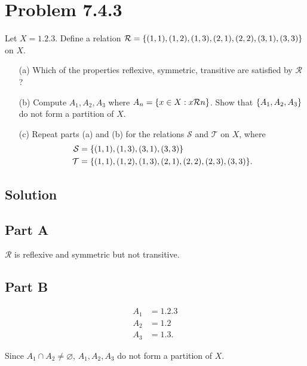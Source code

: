 \documentclass[12pt]{extarticle}
\begin{document}
\section*{Problem 7.4.3}
Let $X = \qty{1,2,3}$. Define a relation $\mathcal{R} = \qty{(1,1),(1,2),(1,3),(2,1),(2,2),(3,1),(3,3)}$ on $X$.

\begin{enumerate}
	\item[(a)] Which of the properties reflexive, symmetric, transitive are satisfied by $\mathcal{R}$?
	\item[(b)] Compute $A_1, A_2, A_3$ where $A_n = \qty{x \in X : x \mathcal{R} n}$. Show that $\qty{A_1, A_2, A_3}$ do not form a partition of $X$.
	\item[(c)] Repeat parts (a) and (b) for the relations $\mathcal{S}$ and $\mathcal{T}$ on $X$, where
		\begin{align*}
			\mathcal{S} &= \qty{(1, 1), (1, 3), (3, 1), (3, 3)} \\
			\mathcal{T} &= \qty{(1,1),(1,2),(1,3),(2,1),(2,2),(2,3),(3,3)}
		.\end{align*}
\end{enumerate}

\subsection*{Solution}
\subsection*{Part A}
$\mathcal{R}$ is reflexive and symmetric but not transitive.

\subsection*{Part B}
\begin{align*}
	A_1 &= \qty{1, 2, 3} \\
	A_2 &= \qty{1, 2} \\
	A_3 &= \qty{1, 3}
.\end{align*}

Since $A_1 \cap A_2 \neq \varnothing$, $A_1, A_2, A_3$ do not form a partition of $X$.
\end{document}
